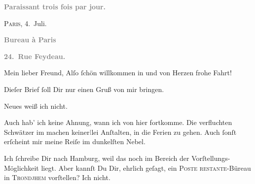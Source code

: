 \pstart
           \begin{otherlanguage}{french}\textcolor{gray}{\textbf{\textbf{Paraissant trois fois par jour.}}}\end{otherlanguage}\hfill \textsc{Paris}, 4. Juli.\pend
           
\pstart
           \begin{otherlanguage}{french}\textcolor{gray}{\textbf{\textbf{Bureau à Paris}}}\end{otherlanguage}\pend
           
\pstart
           \begin{otherlanguage}{french}\textcolor{gray}{\textbf{\textbf{24. Rue Feydeau.}}}\end{otherlanguage}\pend
           
\pstart\center{}Mein lieber Freund,\pend\vspace{0.5em}
\pstart
           Alſo{ }ſchön willkommen in \label{K_L02780-1v}\label{K_L02780-1} und von Herzen frohe
               Fahrt!\pend
           
\pstart
           Dieſer Brief{ }ſoll Dir nur einen Gruß von mir \strikeout{\textcolor{gray}{×}\-\textcolor{gray}{×}\-\textcolor{gray}{×}} bringen.\pend
           
\pstart
           Neues weiß ich nicht.\pend
           
\pstart
           Auch hab’ ich keine Ahnung, wann ich von hier fortkomme. Die verfluchten Schwätzer im
                  {\pb}\label{K_L02780-2v}\label{K_L02780-2} machen keiner\textcolor{gray}{l}lei Anſtalten, in die Ferien zu gehen. Auch{ }ſonſt erſcheint mir meine Reiſe im dunkelſten Nebel.\pend
           
\pstart
           Ich{ }ſchreibe Dir  nach Hamburg,
               weil das noch im Bereich der Vorſtellungs-Möglichkeit liegt. Aber kannſt Du Dir,
               ehrlich geſagt, ein \textsc{Poste restante}-Büreau in \textsc{Trondjhem} vorſtellen? Ich nicht.\pend
           
